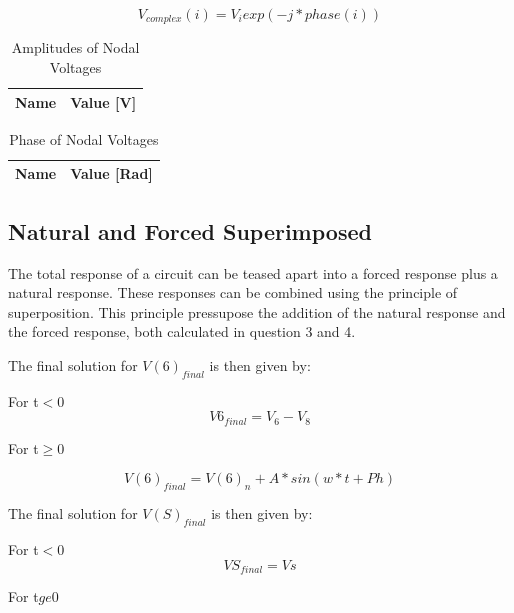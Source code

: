 \begin{equation}
V_{complex}(i)=V_i exp(-j*phase(i))
\end{equation} 


\begin{table}[ht]

  \centering
  \begin{tabular}{|l|r|}
    \hline    
    {\bf Name} & {\bf Value [V]} \\ \hline
    
  \end{tabular}
  \caption{Amplitudes of Nodal Voltages} 
\end{table}


\begin{table}[ht]

  \centering
  \begin{tabular}{|l|r|}
    \hline    
    {\bf Name} & {\bf Value [Rad]} \\ \hline
    
  \end{tabular}
  \caption{Phase of Nodal Voltages} 
\end{table}




\newpage



\subsection{Natural and Forced Superimposed}


The total response of a circuit can be teased apart into a forced response plus a natural response. These responses can be combined using the principle of superposition. This principle pressupose the addition of the natural response and the forced response, both calculated in question 3 and 4.

The final solution for $V(6)_{final}$  is then given by:
\par For t$<$0
\begin{equation}
V6_{final}=V_{6}-V_{8}
\end{equation}
\par For t$\ge$0

\begin{equation}
V(6)_{final}=V(6)_{n} + A*sin(w*t+Ph)
\end{equation}

The final solution for $V(S)_{final}$  is then given by:
\par For t$<$0
\begin{equation}
VS_{final}=Vs
\end{equation}
\par For t$ge$0

